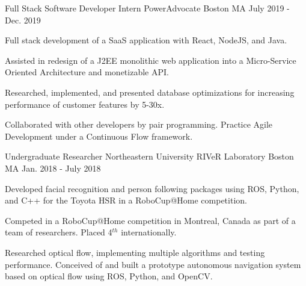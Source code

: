 
\begin{cventries}
\cventry
    {Full Stack Software Developer Intern} %
    {PowerAdvocate} %
    {Boston MA} %
    {July 2019 - Dec. 2019} %
    {
      \begin{cvitems} %
        \item {Full stack development of a SaaS application with React, NodeJS, and Java.}
        \item {Assisted in redesign of a J2EE monolithic web application into a Micro-Service Oriented Architecture and monetizable API.}
        \item {Researched, implemented, and presented database optimizations for increasing performance of customer features by 5-30x.}
        \item {Collaborated with other developers by pair programming. Practice Agile Development under a Continuous Flow framework.}
      \end{cvitems}
    }
  \cventry
    {Undergraduate Researcher} %
    {Northeastern University RIVeR Laboratory} %
    {Boston MA} %
    {Jan. 2018 - July 2018} %
    {
      \begin{cvitems} %
        \item {Developed facial recognition and person following packages using ROS, Python, and C++ for the Toyota HSR in a RoboCup@Home competition.}
        \item {Competed in a RoboCup@Home competition in Montreal, Canada as part of a team of researchers. Placed 4$^{th}$ internationally.}
        \item {Researched optical flow, implementing multiple algorithms and testing performance. Conceived of and built a prototype autonomous navigation system based on optical flow using ROS, Python, and OpenCV.}
      \end{cvitems}
    }


\end{cventries}
